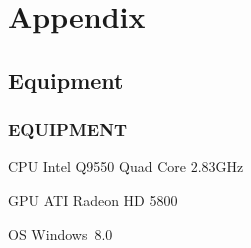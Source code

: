 \section{Appendix}

\subsection{Equipment}
\begin{frame}
\frametitle{EQUIPMENT}

\begin{block}{CPU}
Intel Q9550 Quad Core $2.83$GHz
\end{block}

\begin{block}{GPU}
ATI Radeon HD 5800
\end{block}

\begin{block}{OS}
Windows~8.0
\end{block}

\end{frame}

